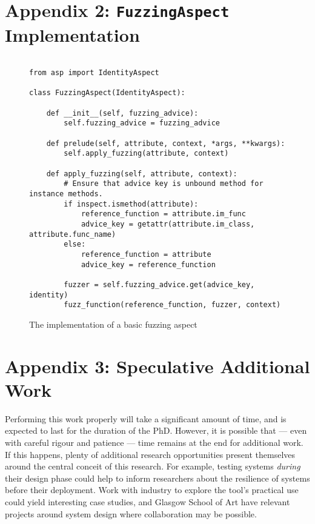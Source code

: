 \documentclass{article}
\begin{document}
\newpage
\section*{Appendix 2: \texttt{FuzzingAspect} Implementation}
\label{app:fuzzing_aspect}

\begin{figure}[H]
  \begin{lstlisting}

from asp import IdentityAspect
    
class FuzzingAspect(IdentityAspect):

    def __init__(self, fuzzing_advice):
        self.fuzzing_advice = fuzzing_advice

    def prelude(self, attribute, context, *args, **kwargs):
        self.apply_fuzzing(attribute, context)

    def apply_fuzzing(self, attribute, context):
        # Ensure that advice key is unbound method for instance methods.
        if inspect.ismethod(attribute):
            reference_function = attribute.im_func
            advice_key = getattr(attribute.im_class, attribute.func_name)
        else:
            reference_function = attribute
            advice_key = reference_function

        fuzzer = self.fuzzing_advice.get(advice_key, identity)
        fuzz_function(reference_function, fuzzer, context)
  \end{lstlisting}
  \label{fig:fuzzing_aspect_code}
  \caption{The implementation of a basic fuzzing aspect}
\end{figure}


\newpage
\section*{Appendix 3: Speculative Additional Work}
Performing this work properly will take a significant amount of time, and is
expected to last for the duration of the PhD. However, it is possible that ---
even with careful rigour and patience --- time remains at the end for additional
work. If this happens, plenty of additional research opportunities present
themselves around the central conceit of this research. For example, testing
systems \emph{during} their design phase could help to inform researchers about
the resilience of systems before their deployment. Work with industry to explore
the tool's practical use could yield interesting case studies, and Glasgow
School of Art have relevant projects around system design where collaboration
may be possible.\par
\end{document}
